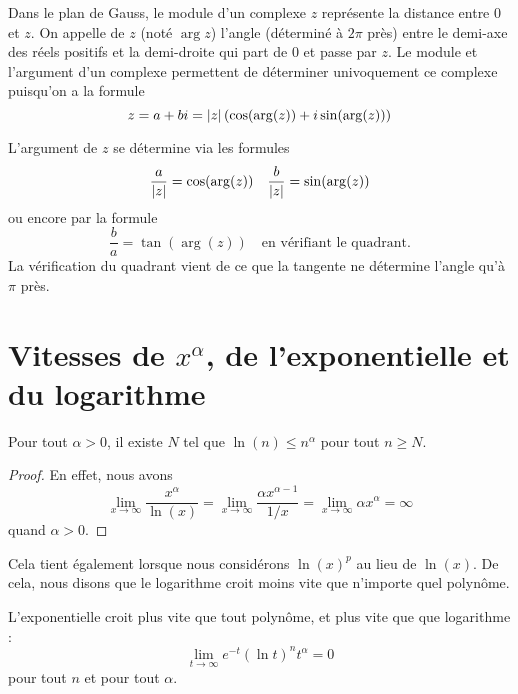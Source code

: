 Dans le plan de Gauss, le module d'un complexe $z$ représente la distance entre $0$ et $z$. On appelle  de $z$ (noté $\arg z$) l'angle (déterminé à $2\pi$ près) entre le demi-axe des réels positifs et la demi-droite qui part de $0$ et passe par $z$. Le module et l'argument d'un complexe permettent de déterminer univoquement ce complexe puisqu'on a la formule
\[z = a + bi = \left\vert z\right\vert \left( \cos(\arg(z)) + i \sin(\arg(z)) \right)\]

L'argument de $z$ se détermine via les formules 
\[\frac a {\left\vert z\right\vert} = \cos(\arg(z)) \quad \frac b {\left\vert z\right\vert} = \sin(\arg(z))\]
ou encore par la formule
\[\frac b a = \tan(\arg(z)) \quad \text{en vérifiant le
  quadrant.}\]
La vérification du quadrant vient de ce que la tangente ne détermine l'angle qu'à $\pi$ près.

\section{Vitesses de $x^{\alpha}$, de l'exponentielle et du logarithme}

\begin{lemma}   \label{LemSYHKooUiSMFJ}
    Pour tout \( \alpha>0\), il existe \( N\) tel que \( \ln(n)\leq n^{\alpha}\) pour tout \( n\geq N\).
\end{lemma}

\begin{proof}
En effet, nous avons
\begin{equation}
    \lim_{x\to\infty} \frac{ x^{\alpha} }{ \ln(x) }=\lim_{x\to\infty} \frac{ \alpha x^{\alpha-1} }{ 1/x }=\lim_{x\to\infty} \alpha x^{\alpha}=\infty
\end{equation}
quand $\alpha>0$. 
\end{proof}
Cela tient également lorsque nous considérons $\ln(x)^p$ au lieu de $\ln(x)$. De cela, nous disons que le logarithme croit moins vite que n'importe quel polynôme. 

\begin{lemma}
    L'exponentielle croit plus vite que tout polynôme, et plus vite que que logarithme :
    \begin{equation}        \label{EqExpDecrtPlusVite}
        \lim_{t\to\infty} e^{-t}(\ln t)^{n}t^{\alpha}=0
    \end{equation}
    pour tout $n$ et pour tout $\alpha$.
\end{lemma}

